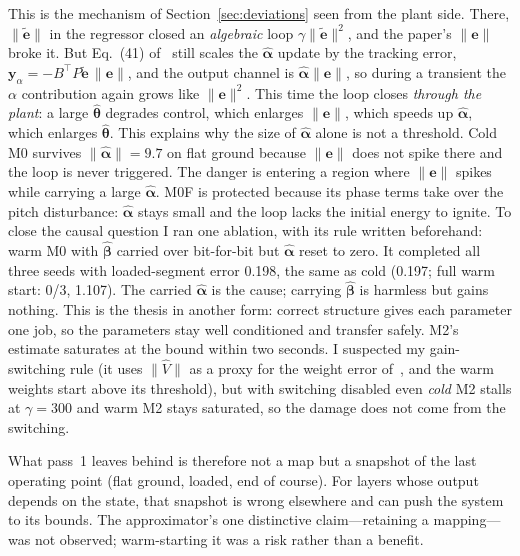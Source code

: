 \documentclass[conference]{IEEEtran}
\newcommand{\thetahat}{\hat{\bm\theta}}
\newcommand{\etilde}{\tilde{\bm e}}
\begin{document}
This is the mechanism of Section~\ref{sec:deviations} seen from the
plant side. There, $\|\etilde\|$ in the regressor closed an
\emph{algebraic} loop $\gamma\|\etilde\|^2$, and the paper's $\|\bm e\|$
broke it. But Eq.~(41) of~\cite{sombolestan2024} still scales the
$\hat{\bm\alpha}$ update by the tracking error,
$\bm y_\alpha=-B^\top P\etilde\,\|\bm e\|$, and the output channel is
$\hat{\bm\alpha}\|\bm e\|$, so during a transient the $\alpha$
contribution again grows like $\|\bm e\|^2$. This time the loop closes
\emph{through the plant}: a large $\thetahat$ degrades control, which
enlarges $\|\bm e\|$, which speeds up $\hat{\bm\alpha}$, which enlarges
$\thetahat$. This explains why the size of $\hat{\bm\alpha}$ alone is
not a threshold. Cold M0 survives $\|\hat{\bm\alpha}\|=9.7$ on flat
ground because $\|\bm e\|$ does not spike there and the loop is never
triggered. The danger is entering a region where $\|\bm e\|$ spikes
while carrying a large $\hat{\bm\alpha}$. M0F is protected because its
phase terms take over the pitch disturbance: $\hat{\bm\alpha}$ stays
small and the loop lacks the initial energy to ignite. To close the
causal question I ran one ablation, with its rule written beforehand:
warm M0 with $\hat{\bm\beta}$ carried over bit-for-bit but
$\hat{\bm\alpha}$ reset to zero. It completed all three seeds with
loaded-segment error 0.198, the same as cold (0.197; full warm start:
0/3, 1.107). The carried $\hat{\bm\alpha}$ is the cause; carrying
$\hat{\bm\beta}$ is harmless but gains nothing. This is the thesis
in another form: correct structure gives each parameter one job, so the
parameters stay well conditioned and transfer safely. M2's estimate saturates at the bound within two
seconds. I suspected my gain-switching rule (it uses $\|\hat V\|$ as a
proxy for the weight error of~\cite{patil2022}, and the warm weights start
above its threshold), but with switching disabled even \emph{cold} M2
stalls at $\gamma=300$ and warm M2 stays saturated, so the damage does not
come from the switching.

What pass~1 leaves behind is therefore not a map but a snapshot of the
last operating point (flat ground, loaded, end of course). For layers
whose output depends on the state, that snapshot is wrong elsewhere and
can push the system to its bounds. The approximator's one distinctive
claim---retaining a mapping---was not observed; warm-starting it was a
risk rather than a benefit.
\end{document}

